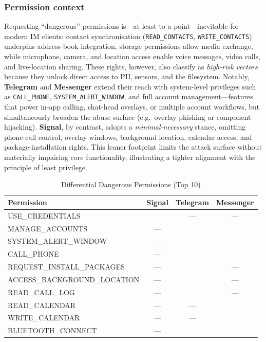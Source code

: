 \documentclass[a4paper,12pt]{report}
\newcommand{\cmark}{\ding{51}} %
\begin{document}
\subsubsection{Permission context}
Requesting “dangerous’’ permissions is—at least to a point—inevitable for
modern IM clients: contact synchronisation (\texttt{READ\_CONTACTS},
\texttt{WRITE\_CONTACTS}) underpins address-book integration, storage
permissions allow media exchange, while microphone, camera, and location
access enable voice messages, video calls, and live-location sharing.  These
rights, however, also classify as \emph{high-risk vectors} because they unlock
direct access to PII, sensors, and the filesystem.  Notably, \textbf{Telegram}
and \textbf{Messenger} extend their reach with system-level privileges such as
\texttt{CALL\_PHONE}, \texttt{SYSTEM\_ALERT\_WINDOW}, and full account
management—features that power in-app calling, chat-head overlays, or multiple
account workflows, but simultaneously broaden the abuse surface (e.g.\ overlay
phishing or component hijacking).  \textbf{Signal}, by contrast, adopts a
\emph{minimal-necessary} stance, omitting phone-call control, overlay windows,
background location, calendar access, and package-installation rights.  This
leaner footprint limits the attack surface without materially impairing core
functionality, illustrating a tighter alignment with the principle of least
privilege.
\begin{table}[htbp]
  \centering
  \caption{Differential Dangerous Permissions (Top 10)}
  \label{tab:differential-permissions}
  \setlength{\tabcolsep}{6pt}
  \begin{tabular}{@{}lccc@{}}
    \toprule
    \textbf{Permission}
        & \textbf{Signal}
        & \textbf{Telegram}
        & \textbf{Messenger} \\ \midrule
    USE\_CREDENTIALS           & \cmark & —      & — \\
    MANAGE\_ACCOUNTS           & —      & \cmark & \cmark \\
    SYSTEM\_ALERT\_WINDOW      & —      & \cmark & \cmark \\
    CALL\_PHONE                & —      & \cmark & \cmark \\
    REQUEST\_INSTALL\_PACKAGES & —      & \cmark & — \\
    ACCESS\_BACKGROUND\_LOCATION & —    & \cmark & — \\
    READ\_CALL\_LOG            & —      & \cmark & — \\
    READ\_CALENDAR             & —      & —      & \cmark \\
    WRITE\_CALENDAR            & —      & —      & \cmark \\
    BLUETOOTH\_CONNECT         & —      & \cmark & \cmark \\ \bottomrule
  \end{tabular}
\end{table}
\end{document}
